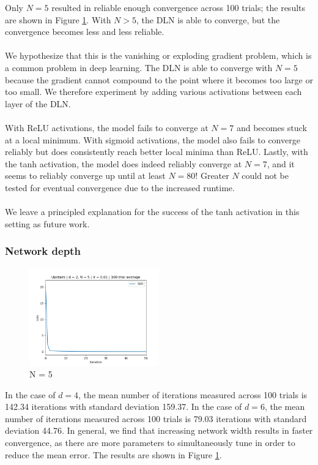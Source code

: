 \documentclass[11pt]{article}
\begin{document}
Only $N=5$ resulted in reliable enough convergence across 100 trials; the results are shown in Figure \ref{fig:results:depth}. With $N > 5$, the DLN is able to converge, but the convergence becomes less and less reliable.
\\\\
We hypothesize that this is the vanishing or exploding gradient problem, which is a common problem in deep learning. The DLN is able to converge with $N=5$ because the gradient cannot compound to the point where it becomes too large or too small. We therefore experiment by adding various activations between each layer of the DLN.
\\\\
With ReLU activations, the model fails to converge at $N = 7$ and becomes stuck at a local minimum. With sigmoid activations, the model also fails to converge reliably but does consistently reach better local minima than ReLU. Lastly, with the tanh activation, the model does indeed reliably converge at $N = 7$, and it seems to reliably converge up until at least $N = 80$! Greater $N$ could not be tested for eventual convergence due to the increased runtime.
\\\\
We leave a principled explanation for the success of the tanh activation in this setting as future work.

\subsubsection{Network depth}
\begin{figure}[h!]
    \centering
    \includegraphics[width=0.5\textwidth]{images/upstairs_avg_n5.png}
    \caption{N = 5}
    \label{fig:results:depth}
\end{figure}
In the case of $d=4$, the mean number of iterations measured across 100 trials is 142.34 iterations with standard deviation 159.37. In the case of $d=6$, the mean number of iterations measured across 100 trials is 79.03 iterations with standard deviation 44.76. In general, we find that increasing network width results in faster convergence, as there are more parameters to simultaneously tune in order to reduce the mean error. The results are shown in Figure \ref{fig:results:depth}.
\end{document}
